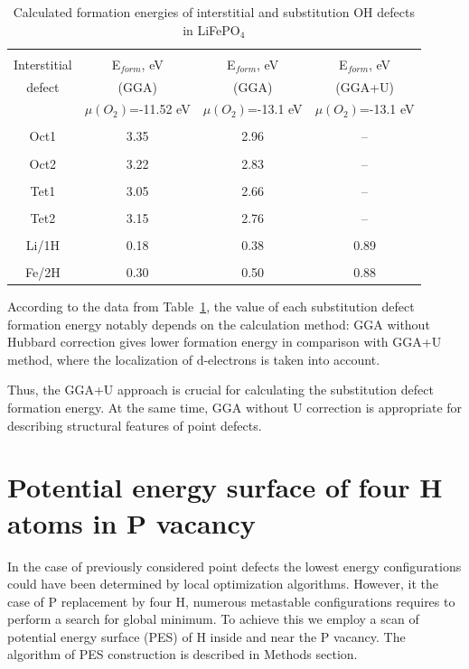 \begin{table}[h]
\footnotesize{
\caption{Calculated formation energies of interstitial and substitution OH defects in LiFePO$_4$}
\label{tabular:intersti}
\begin{center}
\begin{tabular}{|c|c|c|c|}
\hline
& & & \\
Interstitial & E$_{form}$, eV           &  E$_{form}$, eV & E$_{form}$, eV \\
defect      & (GGA)                     &  (GGA) & (GGA+U) \\
            & $\mu(O_2)$=-11.52 eV      &  $\mu(O_2)$=-13.1 eV & $\mu(O_2)$=-13.1 eV \\
\hline
& & & \\
Oct1 & 3.35 & 2.96 & -- \\ 
\hline
& & & \\
Oct2 & 3.22 & 2.83 & -- \\ 
\hline
& & & \\
Tet1 &  3.05 & 2.66 & -- \\ 
\hline
& & & \\
Tet2 &  3.15 & 2.76 & -- \\ 
\hline
& & & \\
Li/1H & 0.18 & 0.38 & 0.89 \\
\hline
& & & \\
Fe/2H & 0.30 & 0.50 & 0.88 \\
\hline
\end{tabular}
\end{center}
}
\end{table}

\par
According to the data from Table~\ref{tabular:intersti}, the value of each substitution defect formation energy notably depends on the calculation method: GGA without Hubbard correction gives lower formation energy in comparison with GGA+U method, where the localization of d-electrons is taken into account. 

Thus, the GGA+U approach is crucial for calculating the substitution defect formation energy. At the same time, GGA without U correction is appropriate for describing structural features of point defects. 

\section{Potential energy surface of four H atoms in P vacancy}
In the case of previously considered point defects the lowest energy configurations could have been determined by local optimization algorithms. However, it the case of P replacement by four H, numerous metastable configurations requires to perform a search for global minimum. To achieve this we employ a scan of potential energy surface (PES) of H inside and near the P vacancy. The algorithm of PES construction is described in Methods section.

